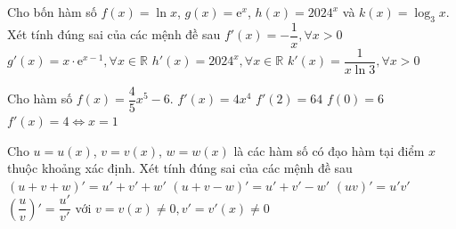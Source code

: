 
\begin{ex}%
 Cho bốn hàm số $f(x)=\ln x$, $g(x)=\mathrm{e}^x$,  $h(x)=2024^x$ và $k(x)=\log_3x$. Xét tính đúng sai của các mệnh đề sau
  \choiceTF
  {$f'(x)=-\dfrac{1}{x}, \forall  x>0$}
  {$g'(x)=x\cdot\mathrm{e}^{x-1} ,\forall x\in\mathbb{R}$} 
  {$h'(x)=2024^x, \forall x\in\mathbb{R}$} 
  {\True $k'(x)=\dfrac{1}{x\ln  3}, \forall x>0$}
\end{ex}

\begin{ex}%
 Cho hàm số $f(x)=\dfrac{4}{5}x^5-6$. 
  \choiceTF
  {\True $f'(x)=4x^4$} 
   {\True $f'(2)=64$}
   {$f(0)=6$}
  {$f'(x)=4\Leftrightarrow x=1$} 
\end{ex}

\begin{ex}%
 Cho $u=u(x)$, $v=v(x)$, $w=w(x)$ là các hàm số có đạo hàm tại điểm $x$ thuộc khoảng xác định. Xét tính đúng sai của  các mệnh đề sau
 \choiceTF 
  {\True  $(u+v+w)'=u'+v'+w'$}
  {\True  $(u+v-w)'=u'+v'-w'$}
   {$(uv)'=u'v'$}
  {$\left(\dfrac{u}{v}\right)'=\dfrac{u'}{v'}$  với $v=v(x)\neq 0, v'=v'(x)\neq 0$}
\end{ex}

